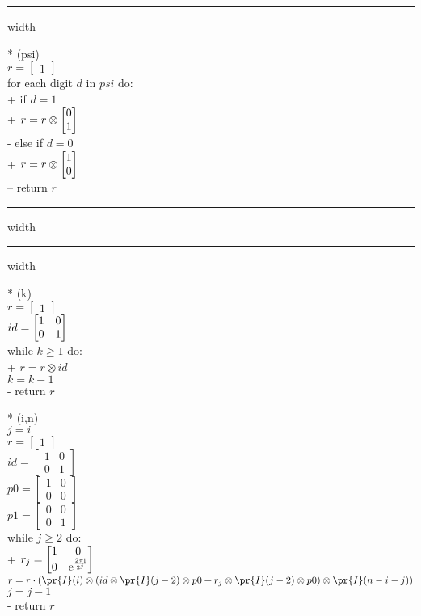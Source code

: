 \hrule width \textwidth
\begin{pseudo}[kw]*
    (psi) \\
$r = \begin{bmatrix}1\end{bmatrix}$  \\
    for each digit $d$ in $psi$ do:\\+
        if $d=1$ \\+
            $r = r \otimes \begin{bmatrix} 0\\ 1\\ \end{bmatrix}$ \\-
        else if $d=0$\\+
            $r = r \otimes \begin{bmatrix} 1\\ 0\\ \end{bmatrix}$ \\--
    return $r$ \\  
\end{pseudo}
\hrule width \textwidth
\vspace{\baselineskip}
\hrule width \textwidth
\begin{pseudo}[kw]*
    (k) \\
$r = \begin{bmatrix}1\end{bmatrix}$  \\
    $id=\begin{bmatrix} 1 & 0\\ 0 & 1\\ \end{bmatrix}$ \\
    while $k\geq 1$ do:\\+
    $r = r \otimes id$ \\
    $k = k-1$\\-
    return $r$ \\  
\end{pseudo}

\begin{pseudo}[kw]*
    (i,n)\\
    $j = i$\\
    $r = \begin{bmatrix}1\end{bmatrix}$  \\
    $id=\begin{bmatrix}1&0\\0&1\end{bmatrix}$ \\
    $p0=\begin{bmatrix}1&0\\0&0\end{bmatrix}$ \\
    $p1=\begin{bmatrix}0&0\\0&1\end{bmatrix}$ \\
    while $j\geq 2$ do: \\+
    $r_j = \begin{bmatrix} 1 & 0\\ 0 & \mathrm{e}^{\frac{2\pi \mathrm{i}}{2^{j}}}\\ \end{bmatrix}$  \\
    $r = r \cdot (\pr{I}(i) \otimes (id \otimes \pr{I}(j-2) \otimes p0 + r_j \otimes \pr{I}(j-2) \otimes p0) \otimes \pr{I}(n-i-j))$ \\
    $j = j-1$\\-
    return $r$ \\  
\end{pseudo}

